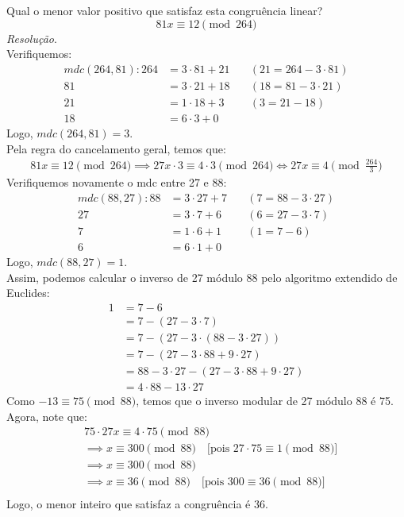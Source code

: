 Qual o menor valor positivo que satisfaz esta congruência linear?
\begin{displaymath}
	81x \equiv 12 \pmod{264}
\end{displaymath}
\emph{Resolução}. \\
Verifiquemos:
\begin{align*}
	mdc(264, 81): 264 &= 3 \cdot 81 + 21 &\quad (21 = 264 - 3 \cdot 81) \\
	81 &= 3 \cdot 21 + 18 &\quad (18 = 81 - 3 \cdot 21) \\
	21 &= 1 \cdot 18 + 3 &\quad (3 = 21 - 18) \\
	18 &= 6 \cdot 3 + 0 
\end{align*}
Logo, $mdc(264, 81) = 3$. \\
Pela regra do cancelamento geral, temos que:
\begin{align*}
	81x \equiv 12 \pmod{264} \implies 27x \cdot 3 \equiv 4 \cdot 3 \pmod{264} \iff 27x \equiv 4 \pmod{\frac{264}{3}}
\end{align*}
Verifiquemos novamente o mdc entre 27 e 88:
\begin{align*}
	mdc(88, 27): 88 &= 3 \cdot 27 + 7 &\quad (7 = 88 - 3 \cdot 27) \\
	27 &= 3 \cdot 7 + 6 &\quad (6 = 27 - 3 \cdot 7) \\
	7 &= 1 \cdot 6 + 1 &\quad (1 = 7 - 6) \\
	6 &= 6 \cdot 1 + 0
\end{align*}
Logo, $mdc(88, 27) = 1$. \\
Assim, podemos calcular o inverso de 27 módulo 88 pelo algoritmo extendido de Euclides:
\begin{align*}
	1 &= 7 - 6 \\
	&= 7 - (27 - 3 \cdot 7) \\
	&= 7 - (27 - 3 \cdot (88 - 3 \cdot 27)) \\
	&= 7 - (27 - 3 \cdot 88 + 9 \cdot 27) \\
	&= 88 - 3 \cdot 27 - (27 - 3 \cdot 88 + 9 \cdot 27)\\
	&= 4 \cdot 88 - 13 \cdot 27
\end{align*}
Como $-13 \equiv 75 \pmod{88}$, temos que o inverso modular de 27 módulo 88 é 75. \\
Agora, note que:
\begin{align*}
	&75 \cdot 27x \equiv 4 \cdot 75 \pmod{88} \\
	&\implies x \equiv 300 \pmod{88} \quad \text{[pois $27 \cdot 75 \equiv 1 \pmod{88}$]} \\
	&\implies x \equiv 300 \pmod{88} \\
	&\implies x \equiv 36 \pmod{88} \quad \text{[pois $300 \equiv 36 \pmod{88}$]} \\
\end{align*}
Logo, o menor inteiro que satisfaz a congruência é 36. \\
